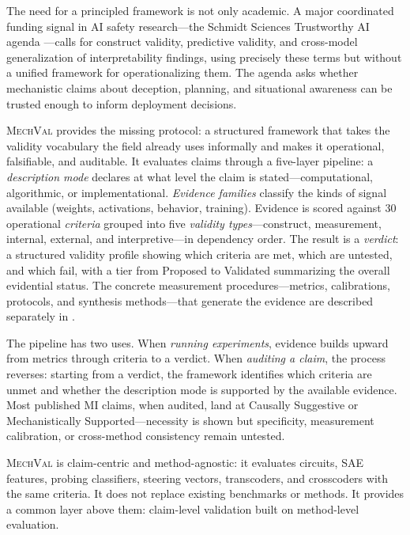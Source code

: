\documentclass{article}
\newcommand{\mechval}{\textsc{MechVal}}
\begin{document}
The need for a principled framework is not only academic.  A major coordinated funding signal in AI safety research---the Schmidt Sciences Trustworthy AI agenda \citep{schmidt2026trustworthy}---calls for construct validity, predictive validity, and cross-model generalization of interpretability findings, using precisely these terms but without a unified framework for operationalizing them.  The agenda asks whether mechanistic claims about deception, planning, and situational awareness can be trusted enough to inform deployment decisions.

\mechval{} provides the missing protocol: a structured framework that takes the validity vocabulary the field already uses informally and makes it operational, falsifiable, and auditable. It evaluates claims through a five-layer pipeline: a \emph{description mode} declares at what level the claim is stated---computational, algorithmic, or implementational. \emph{Evidence families} classify the kinds of signal available (weights, activations, behavior, training). Evidence is scored against 30 operational \emph{criteria} grouped into five \emph{validity types}---construct, measurement, internal, external, and interpretive---in dependency order. The result is a \emph{verdict}: a structured validity profile showing which criteria are met, which are untested, and which fail, with a tier from Proposed to Validated summarizing the overall evidential status. The concrete measurement procedures---metrics, calibrations, protocols, and synthesis methods---that generate the evidence are described separately in .

The pipeline has two uses. When \emph{running experiments}, evidence builds upward from metrics through criteria to a verdict. When \emph{auditing a claim}, the process reverses: starting from a verdict, the framework identifies which criteria are unmet and whether the description mode is supported by the available evidence. Most published MI claims, when audited, land at Causally Suggestive or Mechanistically Supported---necessity is shown but specificity, measurement calibration, or cross-method consistency remain untested.

\mechval{} is claim-centric and method-agnostic: it evaluates circuits, SAE features, probing classifiers, steering vectors, transcoders, and crosscoders with the same criteria. It does not replace existing benchmarks or methods. It provides a common layer above them: claim-level validation built on method-level evaluation.
\end{document}
